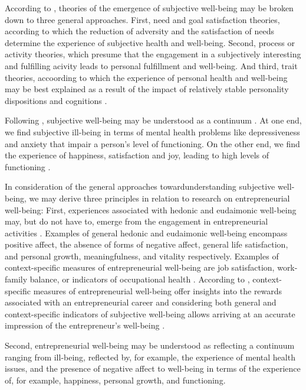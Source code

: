 \documentclass[a4paper,man,noextraspace,natbib]{apa6}
\begin{document}
According to \cite{Diener2002}, theories of the emergence of subjective well-being may be broken down to three general approaches. 
First, need and goal satisfaction theories, according to which the reduction of adversity and the satisfaction of needs determine the experience of subjective health and well-being. 
Second, process or activity theories, which presume that the engagement in a subjectively interesting and fulfilling acivity leads to personal fulfillment and well-being. And third, trait theories, accoording to which the experience of personal health and well-being may be best explained as a result of the impact of relatively stable personality dispositions and cognitions \citep{Diener2002}. \par

Following \cite{Keyes2002}, subjective well-being may be understood as a continuum \cite{Keyes2002}. 
At one end, we find subjective ill-being in terms of mental health problems like depressiveness and anxiety that impair a person's level of functioning. 
On the other end, we find the experience of happiness, satisfaction and joy, leading to high levels of functioning \citep{Keyes2002}. \par

In consideration of the general approaches towardunderstanding subjective well-being, we may derive three principles in relation to research on entrepreneurial well-being: 
First, experiences associated with hedonic and eudaimonic well-being may, but do not have to, emerge from the engagement in entrepreneurial activities \citep{Wiklund2019}.
Examples of general hedonic and eudaimonic well-being encompass positive affect, the absence of forms of negative affect, general life satisfaction, and personal growth, meaningfulness, and vitality respectively. 
Examples of context-specific measures of entrepreneurial well-being are job satisfaction, work-family balance, or indicators of occupational health \cite{Stephan2018}. 
According to \cite{Wiklund2019}, context-specific measures of entrepreneurial well-being offer insights into the rewards associated with an entrepreneurial career and considering both general and context-specific indicators of subjective well-being allows arriving at an accurate impression of the entrepreneur's well-being \citep{Wiklund2019}. \par 

Second, entrepreneurial well-being may be understood as reflecting a continuum ranging from ill-being, reflected by, for example, the experience of mental health issues, and the presence of negative affect to well-being in terms of the experience of, for example, happiness, personal growth, and functioning. \par
\end{document}
